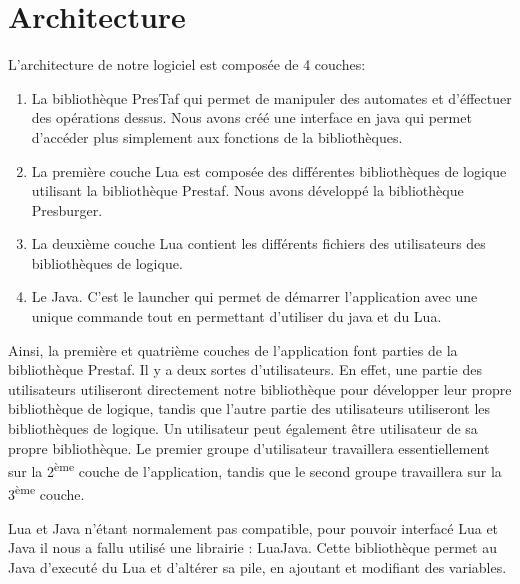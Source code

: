 \section{Architecture}

L'architecture de notre logiciel est composée de 4 couches:
\begin{enumerate}
	\item La bibliothèque PresTaf qui permet de manipuler des automates et d'éffectuer des opérations dessus. Nous avons créé une interface en java qui permet d'accéder plus simplement aux fonctions de la bibliothèques.
	\item La première couche Lua est composée des différentes bibliothèques de logique utilisant la bibliothèque Prestaf. Nous avons développé la bibliothèque Presburger.
	\item La deuxième couche Lua contient les différents fichiers des utilisateurs des bibliothèques de logique.
	\item Le Java. C'est le launcher qui permet de démarrer l'application avec une unique commande tout en permettant d'utiliser du java et du Lua.
\end{enumerate}

Ainsi, la première et quatrième couches de l'application font parties de la bibliothèque Prestaf. Il y a deux sortes d'utilisateurs. En effet, une partie des utilisateurs utiliseront directement notre bibliothèque pour développer leur propre bibliothèque de logique, tandis que l'autre partie des utilisateurs utiliseront les bibliothèques de logique. Un utilisateur peut également être utilisateur de sa propre bibliothèque. Le premier groupe d'utilisateur travaillera essentiellement sur la 2\textsuperscript{ème} couche de l'application, tandis que le second groupe travaillera sur la 3\textsuperscript{ème} couche.\\\par

Lua et Java n'étant normalement pas compatible, pour pouvoir interfacé Lua et Java il nous a fallu utilisé une librairie : LuaJava. Cette bibliothèque permet au Java d'executé du Lua et d'altérer sa pile, en ajoutant et modifiant des variables.\\

